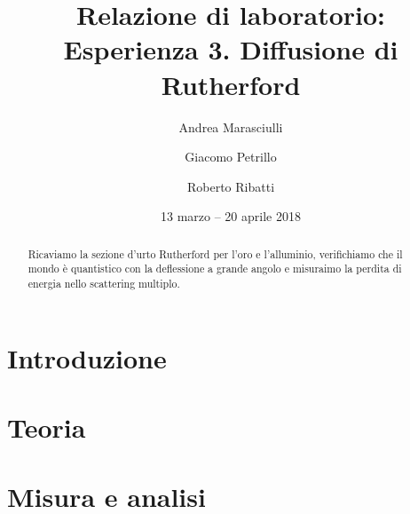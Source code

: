 \documentclass[a4paper]{article}
\title{Relazione di laboratorio:\\
Esperienza 3. Diffusione di Rutherford}
\author{Andrea Marasciulli
\and Giacomo Petrillo
\and Roberto Ribatti}
\date{13 marzo -- 20 aprile 2018}
\begin{document}
\maketitle

\begin{abstract}
	Ricaviamo la sezione d'urto Rutherford per l'oro e l'alluminio, 
	verifichiamo che il mondo è quantistico con la deflessione a grande angolo 
	e misuraimo la perdita di energia nello scattering multiplo.
\end{abstract}

{ \tableofcontents}

\newpage
\section{Introduzione}



\section{Teoria}

\section{Misura e analisi}
\end{document}
